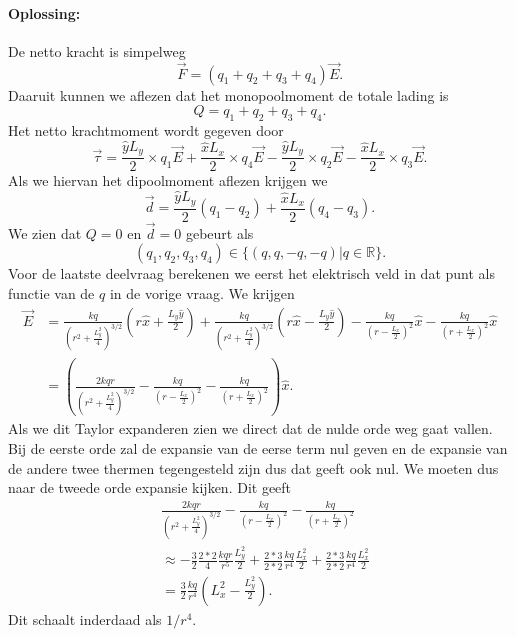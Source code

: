 \documentclass[11pt]{article}
\begin{document}
	\paragraph{Oplossing:}De netto kracht is simpelweg
	\begin{equation}
		\vec{F}=(q_1+q_2+q_3+q_4)\vec{E}.
	\end{equation}
	Daaruit kunnen we aflezen dat het monopoolmoment de totale lading is
	\begin{equation}
		Q=q_1+q_2+q_3+q_4.
	\end{equation}
	Het netto krachtmoment wordt gegeven door
	\begin{equation}
		\vec{\tau}=\frac{\hat{y}L_y}{2}\times q_1\vec{E}+\frac{\hat{x}L_x}{2}\times q_4\vec{E}-\frac{\hat{y}L_y}{2}\times q_2\vec{E}-\frac{\hat{x}L_x}{2}\times q_3\vec{E}.
	\end{equation}
	Als we hiervan het dipoolmoment aflezen krijgen we
	\begin{equation}
		\vec{d}=\frac{\hat{y}L_y}{2}(q_1-q_2)+\frac{\hat{x}L_x}{2}(q_4-q_3).
	\end{equation}
	We zien dat $Q=0$ en $\vec{d}=0$ gebeurt als
	\begin{equation}
		(q_1,q_2,q_3,q_4)\in\{(q,q,-q,-q)|q\in\mathbb{R}\}.
	\end{equation}
	Voor de laatste deelvraag berekenen we eerst het elektrisch veld in dat punt als functie van de $q$ in de vorige vraag. We krijgen
	\begin{align}
		\vec{E}&=\frac{kq}{(r^2+\frac{L_y^2}{4})^{3/2}}(r\hat{x}+\frac{L_y\hat{y}}{2})+\frac{kq}{(r^2+\frac{L_y^2}{4})^{3/2}}(r\hat{x}-\frac{L_y\hat{y}}{2})-\frac{kq}{(r-\frac{L_x}{2})^{2}}\hat{x}-\frac{kq}{(r+\frac{L_x}{2})^2}\hat{x}\\
		&=\left(\frac{2kq r}{(r^2+\frac{L_y^2}{4})^{3/2}}-\frac{kq}{(r-\frac{L_x}{2})^2}-\frac{kq}{(r+\frac{L_x}{2})^2}\right)\hat{x}.
	\end{align}
	Als we dit Taylor expanderen zien we direct dat de nulde orde weg gaat vallen. Bij de eerste orde zal de expansie van de eerse term nul geven en de expansie van de andere twee thermen tegengesteld zijn dus dat geeft ook nul. We moeten dus naar de tweede orde expansie kijken. Dit geeft
	\begin{align}
		&\frac{2kq r}{(r^2+\frac{L_y^2}{4})^{3/2}}-\frac{kq}{(r-\frac{L_x}{2})^2}-\frac{kq}{(r+\frac{L_x}{2})^2}\\
		&\approx -\frac{3}{2}\frac{2*2}{4}\frac{kqr}{r^5}\frac{L_y^2}{2}+\frac{2*3}{2*2}\frac{kq}{r^4}\frac{L_x^2}{2}+\frac{2*3}{2*2}\frac{kq}{r^4}\frac{L_x^2}{2}\\
		&=\frac{3}{2}\frac{kq}{r^4}(L_x^2-\frac{L_y^2}{2}).
	\end{align}
	Dit schaalt inderdaad als $1/r^4$.
\end{document}
